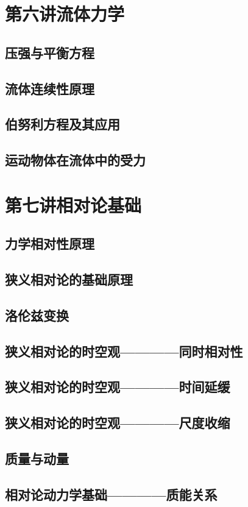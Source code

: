 \documentclass[UTF8]{article}
\begin{document}
\section{第六讲\;\;流体力学}
\subsection{压强与平衡方程}
\subsection{流体连续性原理}
\subsection{伯努利方程及其应用}
\subsection{运动物体在流体中的受力}
\newpage
\section{第七讲\;\;相对论基础}
\subsection{力学相对性原理}
\subsection{狭义相对论的基础原理}
\subsection{洛伦兹变换}
\subsection{狭义相对论的时空观————同时相对性}
\subsection{狭义相对论的时空观————时间延缓}
\subsection{狭义相对论的时空观————尺度收缩}
\subsection{质量与动量}
\subsection{相对论动力学基础————质能关系}
\newpage
\end{document}
